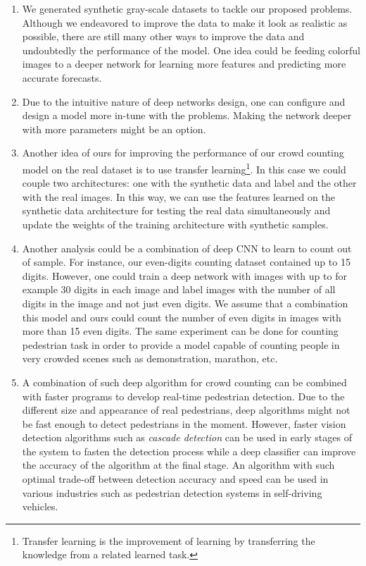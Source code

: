 \begin{enumerate}

	\item We generated synthetic gray-scale datasets to tackle our proposed problems. Although we endeavored to improve the data to make it look as realistic as possible, there are still many other ways to improve the data and undoubtedly the performance of the model. One idea could be feeding colorful images to a deeper network for learning more features and predicting more accurate forecasts.   
	
	\item Due to the intuitive nature of deep networks design, one can configure and design a model more in-tune with the problems. Making the network deeper with more parameters might be an option.
	
	\item Another idea of ours for improving the performance of our crowd counting model on the real dataset is to use transfer learning\footnote{Transfer learning is the improvement of learning by transferring the knowledge from a related learned task.}. In this case we could couple two architectures: one with the synthetic data and label and the other with the real images. In this way, we can use the features learned on the synthetic data architecture for testing the real data simultaneously and update the weights of the training architecture with synthetic samples. 
	
	\item Another analysis could be a combination of deep CNN to learn to count out of sample. For instance, our even-digits counting dataset contained up to 15 digits. However, one could train a deep network with images with up to for example 30 digits in each image and label images with the number of all digits in the image and not just even digits. We assume that a combination this model and ours could count the number of even digits in images with more than 15 even digits. The same experiment can be done for counting pedestrian task in order to provide a model capable of counting people in very crowded scenes such as demonstration, marathon, etc. 
	
	\item A combination of such deep algorithm for crowd counting can be combined with faster programs to develop real-time pedestrian detection. Due to the different size and appearance of real pedestrians, deep algorithms might not be fast enough to detect pedestrians in the moment. However, faster vision detection algorithms such as \textit{cascade detection} can be used in early stages of the system to fasten the detection  process while a deep classifier can improve the accuracy of the algorithm at the final stage. An algorithm with such optimal trade-off between detection accuracy and speed can be used in various industries such as pedestrian detection systems in self-driving vehicles. 
	

\end{enumerate}
